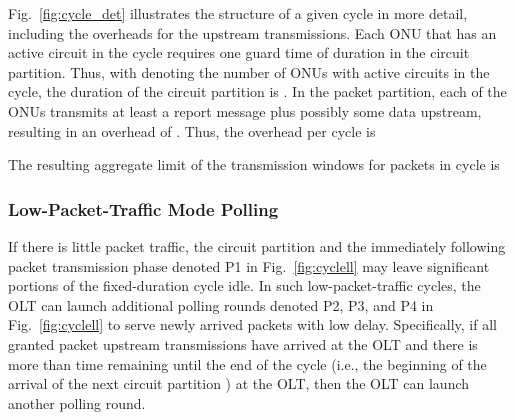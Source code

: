 \documentclass[article]{IEEEtran}
\begin{document}
Fig.~\ref{fig:cycle_det} illustrates the
structure of a given cycle in more detail, including
the overheads for the upstream transmissions.
Each ONU that has an active circuit in the cycle
requires one guard time of duration  in the
circuit partition.
Thus, with  denoting the number of ONUs with active circuits
in the cycle, the duration of the circuit partition is
.
In the packet partition, each of the  ONUs transmits
at least a report message plus possibly some data upstream,
resulting in an overhead of .
Thus, the overhead per cycle is

The resulting aggregate limit of the transmission windows for packets
in cycle  is


\subsubsection{Low-Packet-Traffic Mode Polling}
\label{lowload:sec}
If there is little packet traffic, the circuit partition 
and the immediately following packet transmission phase denoted
P1 in Fig.~\ref{fig:cyclell} may leave significant portions of
the fixed-duration cycle idle.
In such low-packet-traffic cycles, the OLT can launch
additional polling rounds denoted P2, P3, and P4 in Fig.~\ref{fig:cyclell}
to serve newly arrived packets with low delay.
Specifically, if all granted packet upstream transmissions have
arrived at the OLT and there is more than
 time remaining until the end of the cycle
(i.e., the beginning of the arrival of the next circuit
partition ) at the OLT, then the OLT can launch
another polling round.
\end{document}
